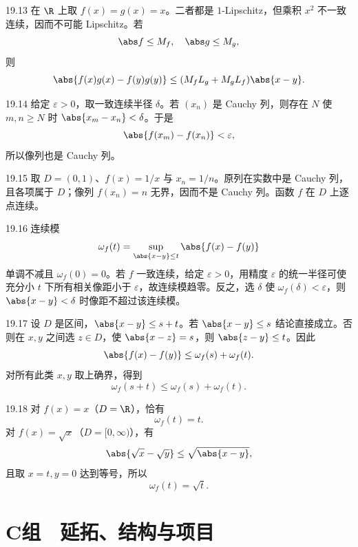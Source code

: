 \begin{solution}{19.13}
在 \(\R\) 上取 \(f(x)=g(x)=x\)。二者都是 \(1\)-Lipschitz，但乘积 \(x^2\) 不一致连续，因而不可能 Lipschitz。若
\[
 \abs f\le M_f,\quad\abs g\le M_g,
\]
则
\[
 \abs{f(x)g(x)-f(y)g(y)}
 \le(M_fL_g+M_gL_f)\abs{x-y}.
\]
\end{solution}

\begin{solution}{19.14}
给定 \(\varepsilon>0\)，取一致连续半径 \(\delta\)。若 \((x_n)\) 是 Cauchy 列，则存在 \(N\) 使 \(m,n\ge N\) 时 \(\abs{x_m-x_n}<\delta\)。于是
\[
 \abs{f(x_m)-f(x_n)}<\varepsilon,
\]
所以像列也是 Cauchy 列。
\end{solution}

\begin{solution}{19.15}
取 \(D=(0,1)\)、\(f(x)=1/x\) 与 \(x_n=1/n\)。原列在实数中是 Cauchy 列，且各项属于 \(D\)；像列 \(f(x_n)=n\) 无界，因而不是 Cauchy 列。函数 \(f\) 在 \(D\) 上逐点连续。
\end{solution}

\begin{solution}{19.16}
连续模
\[
 \omega_f(t)=\sup_{\abs{x-y}\le t}\abs{f(x)-f(y)}
\]
单调不减且 \(\omega_f(0)=0\)。若 \(f\) 一致连续，给定 \(\varepsilon>0\)，用精度 \(\varepsilon\) 的统一半径可使充分小 \(t\) 下所有相关像距小于 \(\varepsilon\)，故连续模趋零。反之，选 \(\delta\) 使 \(\omega_f(\delta)<\varepsilon\)，则 \(\abs{x-y}<\delta\) 时像距不超过该连续模。
\end{solution}

\begin{solution}{19.17}
设 \(D\) 是区间，\(\abs{x-y}\le s+t\)。若 \(\abs{x-y}\le s\) 结论直接成立。否则在 \(x,y\) 之间选 \(z\in D\)，使 \(\abs{x-z}=s\)，则 \(\abs{z-y}\le t\)。因此
\[
 \abs{f(x)-f(y)}
 \le\omega_f(s)+\omega_f(t).
\]
对所有此类 \(x,y\) 取上确界，得到
\[
 \omega_f(s+t)\le\omega_f(s)+\omega_f(t).
\]
\end{solution}

\begin{solution}{19.18}
对 \(f(x)=x\)（\(D=\R\)），恰有
\[
 \omega_f(t)=t.
\]
对 \(f(x)=\sqrt x\)（\(D=[0,\infty)\)），有
\[
 \abs{\sqrt x-\sqrt y}\le\sqrt{\abs{x-y}},
\]
且取 \(x=t,y=0\) 达到等号，所以
\[
 \omega_f(t)=\sqrt t.
\]
\end{solution}

\section*{C组　延拓、结构与项目}

